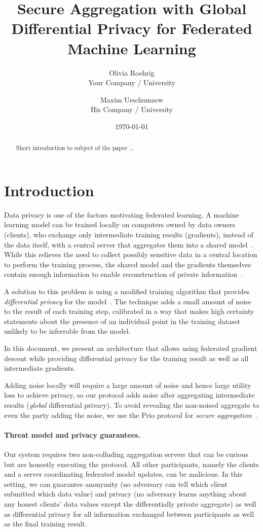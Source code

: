 \documentclass{article}
\title{Secure Aggregation with Global Differential Privacy for Federated Machine Learning}
\author{Olivia Roehrig  \\
	Your Company / University  \\
	\and
	Maxim Urschumzew \\
	His Company / University \\
	}
\date{\today}
\begin{document}
\maketitle


\begin{abstract}
Short introduction to subject of the paper \ldots 
\end{abstract}

\section{Introduction}
Data privacy is one of the factors motivating federated learning. A machine learning model can be trained locally on computers owned by data owners (clients), who exchange only intermediate training results (gradients), instead of the data itself, with a central server that aggregates them into a shared model~\cite{McMahan2016CommunicationEfficientLO}. While this relieves the need to collect possibly sensitive data in a central location to perform the training process, the shared model and the gradients themselves contain enough information to enable reconstruction of private information~\cite{7958568}\cite{Boenisch2021WhenTC}.

A solution to this problem is using a modified training algorithm that provides \emph{differential privacy} for the model~\cite{Abadi_2016}. The technique adds a small amount of noise to the result of each training step, calibrated in a way that makes high certainty statements about the presence of an individual point in the training dataset unlikely to be inferrable from the model.

In this document, we present an architecture that allows using federated gradient descent while providing differential privacy for the training result as well as all intermediate gradients.

Adding noise locally will require a large amount of noise and hence large utility loss to achieve privacy, so our protocol adds noise after aggregating intermediate results (\emph{global} differential privacy). To avoid revealing the non-noised aggregate to even the party adding the noise, we use the Prio protocol for \emph{secure aggregation}~\cite{prio}.

\paragraph{Threat model and privacy guarantees.}
Our system requires two non-colluding aggregation servers that can be curious but are honestly executing the protocol. All other participants, namely the clients and a server coordinating federated model updates, can be malicious. In this setting, we can guarantee anonymity (no adversary can tell which client submitted which data value) and privacy (no adversary learns anything about any honest clients' data values except the differentially private aggregate) as well as differential privacy for all information exchanged between participants as well as the final training result.
\end{document}
